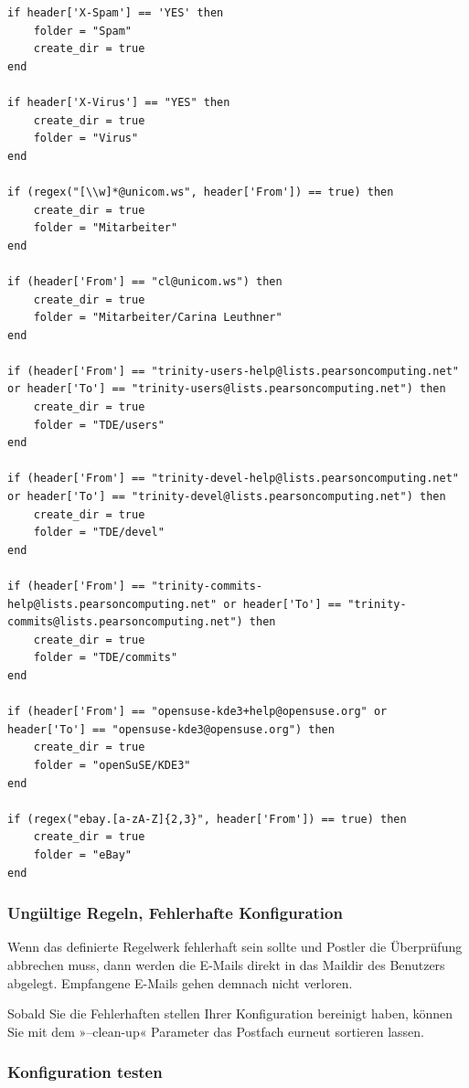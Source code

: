 \documentclass[a4paper,10pt]{article}
\begin{document}
\begin{lstlisting}[style=Lua]
if header['X-Spam'] == 'YES' then
    folder = "Spam"
    create_dir = true
end

if header['X-Virus'] == "YES" then
    create_dir = true
    folder = "Virus"
end

if (regex("[\\w]*@unicom.ws", header['From']) == true) then
    create_dir = true
    folder = "Mitarbeiter"
end

if (header['From'] == "cl@unicom.ws") then
    create_dir = true
    folder = "Mitarbeiter/Carina Leuthner"
end

if (header['From'] == "trinity-users-help@lists.pearsoncomputing.net" or header['To'] == "trinity-users@lists.pearsoncomputing.net") then
    create_dir = true
    folder = "TDE/users"
end

if (header['From'] == "trinity-devel-help@lists.pearsoncomputing.net" or header['To'] == "trinity-devel@lists.pearsoncomputing.net") then
    create_dir = true
    folder = "TDE/devel"
end

if (header['From'] == "trinity-commits-help@lists.pearsoncomputing.net" or header['To'] == "trinity-commits@lists.pearsoncomputing.net") then
    create_dir = true
    folder = "TDE/commits"
end

if (header['From'] == "opensuse-kde3+help@opensuse.org" or header['To'] == "opensuse-kde3@opensuse.org") then
    create_dir = true
    folder = "openSuSE/KDE3"
end

if (regex("ebay.[a-zA-Z]{2,3}", header['From']) == true) then
    create_dir = true
    folder = "eBay"
end
\end{lstlisting}

\subsubsection{Ungültige Regeln, Fehlerhafte Konfiguration}

Wenn das definierte Regelwerk fehlerhaft sein sollte und Postler die Überprüfung abbrechen muss, dann werden die E-Mails direkt in das Maildir des Benutzers abgelegt. Empfangene E-Mails gehen demnach nicht verloren.

Sobald Sie die Fehlerhaften stellen Ihrer Konfiguration bereinigt haben, können Sie mit dem »--clean-up« Parameter das Postfach eurneut sortieren lassen.

\subsubsection{Konfiguration testen}
\end{document}
